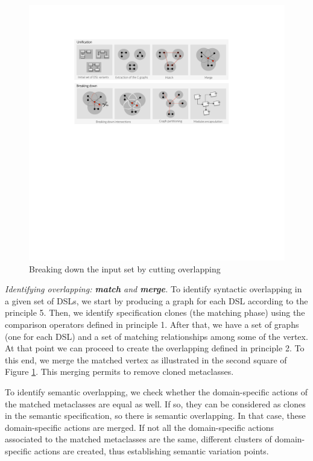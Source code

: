 \begin{figure}
\centering
\includegraphics[width=0.8\linewidth]{images/fig-reverse-engineering-detailed}
\caption{Breaking down the input set by cutting overlapping}
\label{fig:breakingdown}
\end{figure}

\vspace{2mm}
\textit{Identifying overlapping: \textbf{match} and \textbf{merge}.} To identify syntactic overlapping in a given set of DSLs, we start by producing a graph for each DSL according to the principle 5. Then, we identify specification clones (the matching phase) using the comparison operators defined in principle 1. After that, we have a set of graphs (one for each DSL) and a set of matching relationships among some of the vertex. At that point we can proceed to create the overlapping defined in principle 2. To this end, we merge the matched vertex as illustrated in the second square of Figure \ref{fig:breakingdown}. This merging permits to remove cloned metaclasses.

To identify semantic overlapping, we check whether the domain-specific actions of the matched metaclasses are equal as well. If so, they can be considered as clones in the semantic specification, so there is semantic overlapping. In that case, these domain-specific actions are merged. If not all the domain-specific actions associated to the matched metaclasses are the same, different clusters of domain-specific actions are created, thus establishing semantic variation points.

